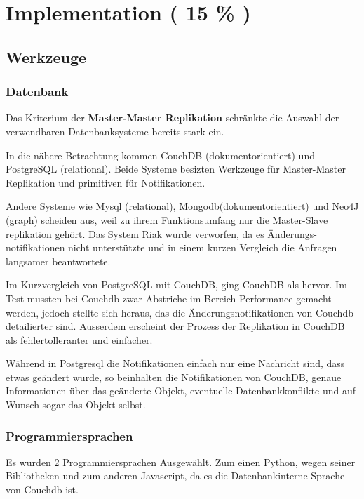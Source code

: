 \chapter{Implementation ( 15 \% ) }


\section{Werkzeuge}
\subsection{Datenbank}

Das Kriterium der \textbf{Master-Master Replikation}
schr\"ankte die Auswahl der verwendbaren Datenbanksysteme bereits stark ein.

In die n\"ahere Betrachtung kommen CouchDB (dokumentorientiert)
und PostgreSQL (relational).
Beide Systeme besizten Werkzeuge f\"ur Master-Master Replikation
und primitiven f\"ur Notifikationen.

Andere Systeme wie Mysql (relational), Mongodb(dokumentorientiert)
und  Neo4J (graph) scheiden aus, weil zu ihrem Funktionsumfang
nur die Master-Slave replikation geh\"ort.
Das System Riak wurde verworfen, da es \"Anderungs-notifikationen
nicht unterst\"utzte und in einem kurzen Vergleich
die Anfragen langsamer beantwortete.

Im Kurzvergleich von PostgreSQL mit CouchDB,
ging CouchDB als  hervor.
Im Test mussten bei Couchdb zwar Abstriche im Bereich Performance gemacht werden,
jedoch stellte sich heraus, das die \"Anderungsnotifikationen von Couchdb detailierter sind.
Ausserdem erscheint der Prozess der Replikation in CouchDB
als fehlertolleranter und einfacher.

W\"ahrend in Postgresql die Notifikationen einfach nur eine Nachricht sind,
dass etwas ge\"andert wurde,
so beinhalten die Notifikationen von CouchDB, genaue Informationen
\"uber das ge\"anderte Objekt, eventuelle Datenbankkonflikte
und auf Wunsch sogar das Objekt selbst.

\subsection{Programmiersprachen}

Es wurden 2 Programmiersprachen Ausgew\"ahlt.
Zum einen Python, wegen seiner Bibliotheken und
zum anderen Javascript, da es die Datenbankinterne Sprache von Couchdb ist.

